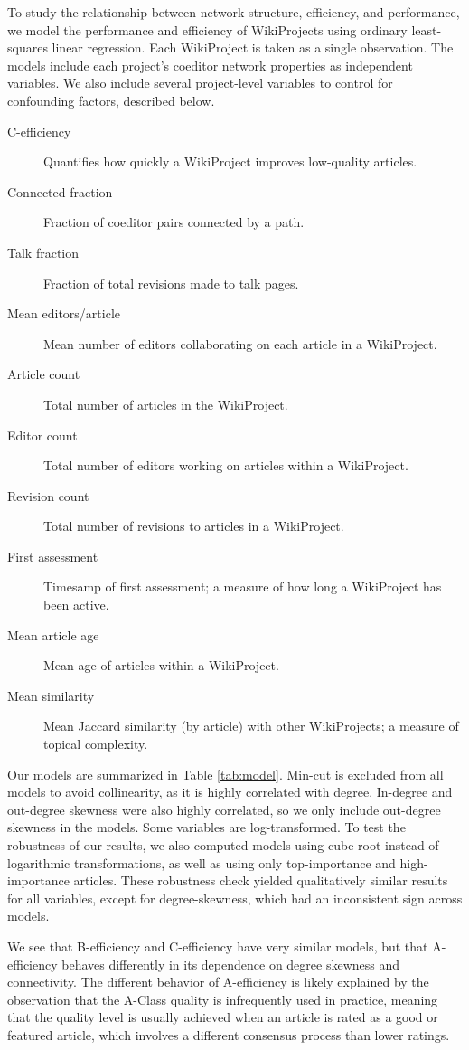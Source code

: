 To study the relationship between network structure, efficiency, and performance,
we model the performance and efficiency of WikiProjects using ordinary least-squares linear regression.
Each WikiProject is taken as a single observation.
The models include each project's coeditor network properties as independent variables.
We also include several project-level variables to control for confounding factors,
described below.
\begin{description}
\item[C-efficiency] Quantifies how quickly a WikiProject improves low-quality articles.
\item[Connected fraction] Fraction of coeditor pairs connected by a path.
\item[Talk fraction] Fraction of total revisions made to talk pages.
\item[Mean editors/article] Mean number of editors collaborating on each article in a WikiProject.
\item[Article count] Total number of articles in the WikiProject.
\item[Editor count] Total number of editors working on articles within a WikiProject.
\item[Revision count] Total number of revisions to articles in a WikiProject.
\item[First assessment] Timesamp of first assessment; a measure of how long a WikiProject has been active.
\item[Mean article age] Mean age of articles within a WikiProject.
\item[Mean similarity] Mean Jaccard similarity (by article) with other WikiProjects; a measure of topical complexity.
\end{description}

Our models are summarized in Table \ref{tab:model}.
Min-cut is excluded from all models to avoid collinearity,
as it is highly correlated with degree.
In-degree and out-degree skewness were also highly correlated,
so we only include out-degree skewness in the models.
Some variables are log-transformed.
To test the robustness of our results,
we also computed models using cube root instead of logarithmic transformations,
as well as using only top-importance and high-importance articles.
These robustness check yielded qualitatively similar results for all variables,
except for degree-skewness, which had an inconsistent sign across models.

We see that B-efficiency and C-efficiency have very similar models, but that A-efficiency behaves
differently in its dependence on degree skewness and connectivity.
The different behavior of A-efficiency is likely explained by the observation that the A-Class quality is
infrequently used in practice, meaning that the quality level is usually achieved when an article is rated
as a good or featured article, which involves a different consensus process than lower ratings.

